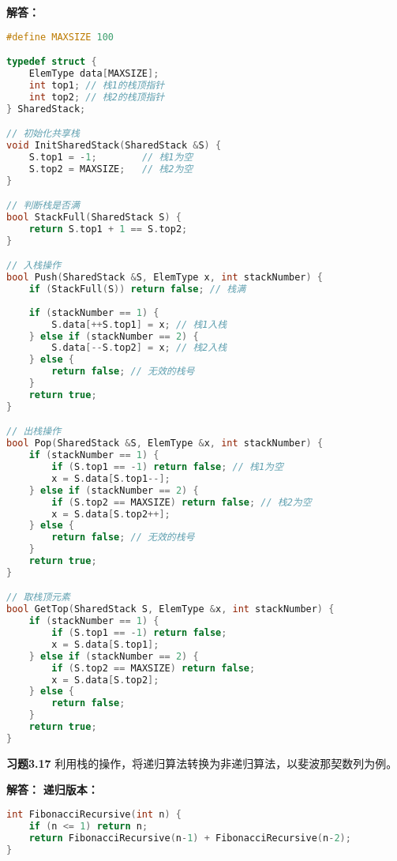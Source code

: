 \documentclass[12pt,a4paper]{amsart}
\begin{document}
\textbf{解答：}
\begin{lstlisting}[language=C++]
#define MAXSIZE 100

typedef struct {
    ElemType data[MAXSIZE];
    int top1; // 栈1的栈顶指针
    int top2; // 栈2的栈顶指针
} SharedStack;

// 初始化共享栈
void InitSharedStack(SharedStack &S) {
    S.top1 = -1;        // 栈1为空
    S.top2 = MAXSIZE;   // 栈2为空
}

// 判断栈是否满
bool StackFull(SharedStack S) {
    return S.top1 + 1 == S.top2;
}

// 入栈操作
bool Push(SharedStack &S, ElemType x, int stackNumber) {
    if (StackFull(S)) return false; // 栈满
    
    if (stackNumber == 1) {
        S.data[++S.top1] = x; // 栈1入栈
    } else if (stackNumber == 2) {
        S.data[--S.top2] = x; // 栈2入栈
    } else {
        return false; // 无效的栈号
    }
    return true;
}

// 出栈操作
bool Pop(SharedStack &S, ElemType &x, int stackNumber) {
    if (stackNumber == 1) {
        if (S.top1 == -1) return false; // 栈1为空
        x = S.data[S.top1--];
    } else if (stackNumber == 2) {
        if (S.top2 == MAXSIZE) return false; // 栈2为空
        x = S.data[S.top2++];
    } else {
        return false; // 无效的栈号
    }
    return true;
}

// 取栈顶元素
bool GetTop(SharedStack S, ElemType &x, int stackNumber) {
    if (stackNumber == 1) {
        if (S.top1 == -1) return false;
        x = S.data[S.top1];
    } else if (stackNumber == 2) {
        if (S.top2 == MAXSIZE) return false;
        x = S.data[S.top2];
    } else {
        return false;
    }
    return true;
}
\end{lstlisting}

\textbf{习题3.17} 利用栈的操作，将递归算法转换为非递归算法，以斐波那契数列为例。

\textbf{解答：}
\textbf{递归版本：}
\begin{lstlisting}[language=C++]
int FibonacciRecursive(int n) {
    if (n <= 1) return n;
    return FibonacciRecursive(n-1) + FibonacciRecursive(n-2);
}
\end{lstlisting}
\end{document}
